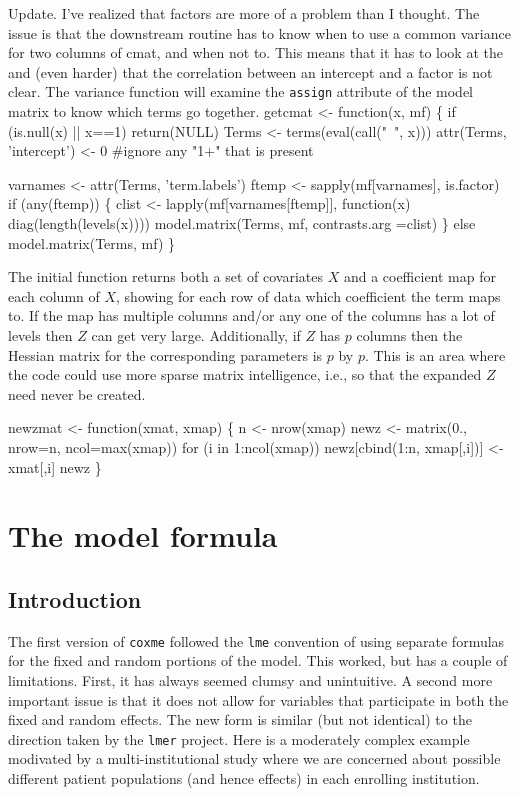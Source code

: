 \documentclass{article}
\begin{document}
Update. I've realized that factors are more of a problem than I   %
thought.  The issue is that the downstream routine has to know
when to use a common variance for two columns of cmat, and when not to.
This means that it has to look at the 
and (even harder) that the correlation between an intercept and a factor
is not clear.  The variance function will examine the {\tt{}assign} attribute
of the model matrix to know which terms go together.
\nwenddocs{}\endmoddef
getcmat <- function(x, mf) \{
    if (is.null(x) || x==1) return(NULL)
    Terms <- terms(eval(call("~", x)))
    attr(Terms, 'intercept') <- 0  #ignore any "1+" that is present

    varnames <-  attr(Terms, 'term.labels')
    ftemp <- sapply(mf[varnames], is.factor)
    if (any(ftemp)) \{
        clist <- lapply(mf[varnames[ftemp]], 
                        function(x) diag(length(levels(x))))
        model.matrix(Terms, mf, contrasts.arg =clist)
        \}
    else model.matrix(Terms, mf)
    \}
\nwendcode{}\nwdocspar

The initial function returns both a set of covariates $X$ and
a coefficient map for each column of $X$, showing for each
row of data which coefficient the term maps to.
If the map has multiple columns and/or any one of the columns has a lot of 
levels then $Z$ can get very large.  
Additionally, if $Z$ has $p$ columns then the Hessian matrix 
for the corresponding
parameters is $p$ by $p$.  
This is an area where the code could use more sparse matrix intelligence, i.e.,
so that the expanded $Z$ need never be created.

\nwenddocs{}\endmoddef
newzmat <- function(xmat, xmap) \{
    n <- nrow(xmap)
    newz <- matrix(0., nrow=n, ncol=max(xmap))
    for (i in 1:ncol(xmap)) 
        newz[cbind(1:n, xmap[,i])] <- xmat[,i]
    newz
    \}
\nwendcode{}\nwdocspar
\section{The model formula}
\subsection{Introduction}
The first version of {\tt{}coxme} followed the {\tt{}lme} convention of
using separate formulas for the fixed and random portions of the
model.
This worked, but has a couple of limitations.
First, it has always seemed clumsy and unintuitive.  
A second more important issue is that it does not allow for
variables that participate in both the fixed and random effects. 
The new form is similar (but not identical) to the direction
taken by the {\tt{}lmer} project.  
Here is a moderately complex example modivated by a multi-institutional
study where we are concerned about possible different patient
populations (and hence effects) in each enrolling institution.
\end{document}

